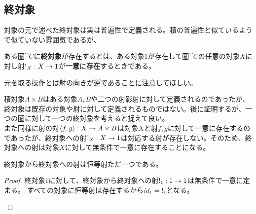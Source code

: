 \subsection{終対象}
  対象の元で述べた終対象は実は普遍性で定義される。積の普遍性と似ているようで似ていない雰囲気であるが、
	\begin{define}[終対象]
		ある圏$\cat{C}$に\textbf{終対象}が存在するとは、ある対象$1$が存在して圏$\cat{C}$の任意の対象$X$に対し射$!_X:X\rightarrow 1$が\textbf{一意}に\textbf{存在}するときである。

		元を取る操作とは射の向きが逆であることに注意してほしい。
	\end{define}
  積対象$A\times B$はある対象$A,B$や二つの射影射に対して定義されるのであったが、終対象は既存の対象や射に対して定義されるものではない。後に証明するが、一つの圏に対して一つの終対象を考えると捉えて良い。\\
	また同様に射の対$\langle f,g\rangle:X\rightarrow A\times B$は対象$X$と射$f,g$に対して一意に存在するのであったが、終対象への射$!_X:X\rightarrow 1$は対応する射が存在しない。そのため、終対象への射は対象$X$に対して無条件で一意に存在することになる。
	\begin{prop}[終対象から終対象への射]
		終対象から終対象への射は恒等射ただ一つである。
	\end{prop}
	\begin{proof}
		終対象$1$に対して、終対象から終対象への射$!_1:1\rightarrow 1$は無条件で一意に定まる。
		すべての対象に恒等射は存在するから$id_1=!_1$となる。
		\begin{center}
		\end{center}
	\end{proof}

